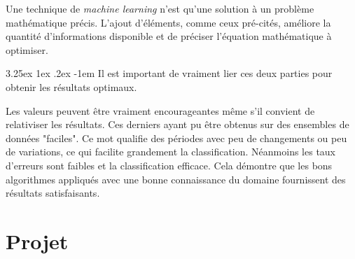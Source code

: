 \documentclass[a4paper, 11pt]{article}
\makeatletter
\renewcommand\paragraph{\@startsection{paragraph}{5}{\z@}%
  {3.25ex \@plus1ex \@minus.2ex}%
  {-1em}%
  {\normalfont\normalsize\bfseries}}
\makeatother
\begin{document}
Une technique de \textit{machine learning} n'est qu'une solution à un problème mathématique précis. L'ajout d'éléments, comme ceux pré-cités, améliore la quantité d'informations disponible et de préciser l'équation mathématique à optimiser.

\paragraph{}
Il est important de vraiment lier ces deux parties pour obtenir les résultats optimaux.

Les valeurs peuvent être vraiment encourageantes même s'il convient de relativiser les résultats. Ces derniers ayant pu être obtenus sur des ensembles de données "faciles". Ce mot qualifie des périodes avec peu de changements ou peu de variations, ce qui facilite grandement la classification.
Néanmoins les taux d'erreurs sont faibles et la classification efficace.
Cela démontre que les bons algorithmes appliqués avec une bonne connaissance du domaine fournissent des résultats satisfaisants. 


\newpage
\section{Projet}
\newpage



\nocite{*}

\end{document}
